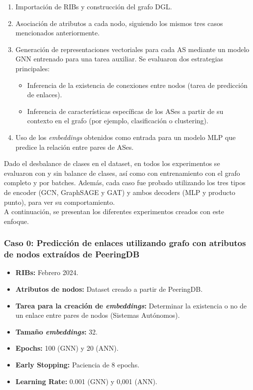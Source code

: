 \begin{enumerate}
    \item Importación de RIBs y construcción del grafo DGL.
    \item Asociación de atributos a cada nodo, siguiendo los mismos tres casos mencionados anteriormente.
    \item Generación de representaciones vectoriales para cada AS mediante un modelo GNN entrenado para una tarea auxiliar. Se evaluaron dos estrategias principales:
    \begin{itemize}
        \item Inferencia de la existencia de conexiones entre nodos (tarea de predicción de enlaces).
        \item Inferencia de características específicas de los ASes a partir de su contexto en el grafo (por ejemplo, clasificación o clustering).
    \end{itemize}
    \item Uso de los \textit{embeddings} obtenidos como entrada para un modelo MLP que predice la relación entre pares de ASes.
\end{enumerate}

Dado el desbalance de clases en el dataset, en todos los experimentos se evaluaron con y sin balance de clases, así como con entrenamiento con el grafo completo y por batches. Además, cada caso fue probado utilizando los tres tipos de encoder (GCN, GraphSAGE y GAT) y ambos decoders (MLP y producto punto), para ver su comportamiento.\\

A continuación, se presentan los diferentes experimentos creados con este enfoque.\\



\subsubsection{Caso 0: Predicción de enlaces utilizando grafo con atributos de nodos extraídos de PeeringDB}

\begin{itemize}
    \item \textbf{RIBs:} Febrero 2024.
    \item \textbf{Atributos de nodos:} Dataset creado a partir de PeeringDB.
   \item \textbf{Tarea para la creación de \textit{embeddings}:} Determinar la existencia o no de un enlace entre pares de nodos (Sistemas Autónomos).
    \item \textbf{Tamaño \textit{embeddings}:} 32.
    \item \textbf{Epochs:} 100 (GNN) y 20 (ANN).
    \item \textbf{Early Stopping:} Paciencia de 8 epochs.
    \item \textbf{Learning Rate:} 0.001 (GNN) y 0,001 (ANN).
\end{itemize}




